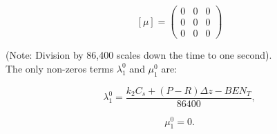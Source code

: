 $$
  [\mu] =
  \begin{pmatrix}
     0  & 0 & 0 \\
     0  & 0 & 0 \\
     0  & 0 & 0
  \end{pmatrix}
$$

(Note: Division by 86,400 scales down the time to one second).\\

The only non-zeros terms $ \lambda_1^0$ and $ \mu_1^0$ are:

\begin{equation}
  \lambda_1^0 = \frac{k_2 C_s + (P - R) \Delta z - BEN_T}{86400},
\end{equation}

\begin{equation}
  \mu_1^0 = 0.
\end{equation}
